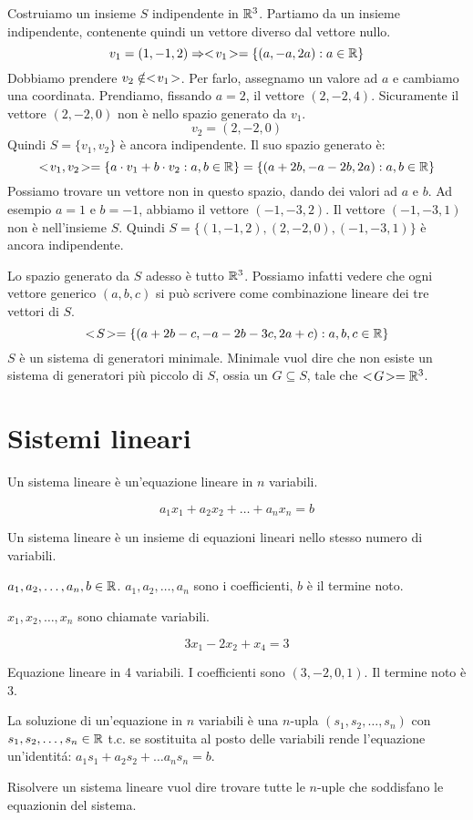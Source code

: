 Costruiamo un insieme $S$ indipendente in $\mathbb{R}^3$. Partiamo da un insieme indipendente, contenente quindi un vettore diverso dal vettore nullo.
\[
v_1 = (1, -1, 2) \Rightarrow <\!{v_1}\!> = \{ (a, -a, 2a) : a \in \mathbb{R} \}
\]
Dobbiamo prendere $v_2 \notin <\!{v_1}\!>$. Per farlo, assegnamo un valore ad $a$ e cambiamo una coordinata. Prendiamo, fissando $a = 2$, il vettore $(2, -2, 4)$. Sicuramente il vettore $(2, -2, 0)$ non \`e nello spazio generato da $v_1$.
\[
v_2 = (2, -2, 0)
\]
Quindi $S = \{ v_1, v_2 \}$ \`e ancora indipendente. Il suo spazio generato \`e:
\[
<\!{v_1, v_2}\!> = \{ a \cdot v_1 + b \cdot v_2 : a, b \in \mathbb{R} \} = 
\{ (a + 2b, -a -2b, 2a) : a, b \in \mathbb{R} \}
\]
Possiamo trovare un vettore non in questo spazio, dando dei valori ad $a$ e $b$. Ad esempio $a = 1$ e $b = -1$, abbiamo il vettore $(-1, -3, 2)$. Il vettore $(-1, -3, 1)$ non \`e nell'insieme $S$. Quindi $S = \{(1, -1, 2), (2, -2, 0), (-1, -3, 1) \}$ \`e ancora indipendente.

Lo spazio generato da $S$ adesso \`e tutto $\mathbb{R}^3$. Possiamo infatti vedere che ogni vettore generico $(a,b,c)$ si pu\`o scrivere come combinazione lineare dei tre vettori di $S$.
\[
<\!{S}\!> = \{ (a + 2b - c, -a -2b -3c, 2a + c) : a, b, c \in \mathbb{R} \}
\]
$S$ \`e un sistema di generatori minimale. Minimale vuol dire che non esiste un sistema di generatori pi\`u piccolo di $S$, ossia un $G \subseteq S$, tale che $<\!{G}\!> = \mathbb{R}^3$.


\section{Sistemi lineari}

Un sistema lineare \`e un'equazione lineare in $n$ variabili.

\[
a_1 x_1 + a_2 x_2 + \dots + a_n x_n = b
\]

Un sistema lineare \`e un insieme di equazioni lineari nello stesso numero di variabili.

$a_1, a_2, \dots, a_n, b \in \mathbb{R}$. $a_1, a_2, \dots, a_n$ sono i coefficienti, $b$ \`e il termine noto.

$x_1, x_2, \dots, x_n$ sono chiamate variabili.

\[
3x_1 - 2x_2 + x_4 = 3
\]

Equazione lineare in 4 variabili. I coefficienti sono $(3, -2, 0, 1)$. Il termine noto \`e 3.

La soluzione di un'equazione in $n$ variabili \`e una $n$-upla $(s_1, s_2, \dots, s_n)$ con $s_1, s_2, \dots, s_n \in \mathbb{R}$ t.c. se sostituita al posto delle variabili rende l'equazione un'identit\'a: $a_1 s_1 + a_2 s_2 + \dots a_n s_n = b$.

Risolvere un sistema lineare vuol dire trovare tutte le $n$-uple che soddisfano le equazionin del sistema.
















